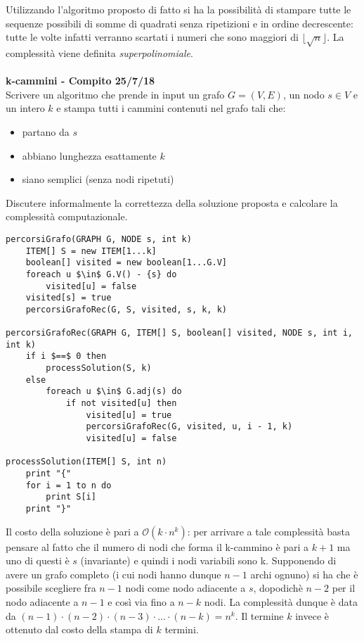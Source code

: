 \documentclass[../cheatSheetAlgoritmi.tex]{subfiles}
\begin{document}
Utilizzando l'algoritmo proposto di fatto si ha la possibilità di stampare tutte le sequenze possibili di somme di quadrati senza ripetizioni e in ordine decrescente: tutte le volte infatti verranno scartati i numeri che sono maggiori di $\lfloor \sqrt n \rfloor$. La complessità viene definita \emph{superpolinomiale}.\\\\
\textbf{k-cammini - Compito 25/7/18}\\
Scrivere un algoritmo che prende in input un grafo $G= (V, E)$, un nodo $s \in V$ e un intero $k$ e stampa tutti i cammini contenuti nel grafo tali che:
\begin{itemize}
	\item partano da $s$
	\item abbiano lunghezza esattamente $k$
	\item siano semplici (senza nodi ripetuti)
\end{itemize}
Discutere informalmente la correttezza della soluzione proposta e calcolare la complessità computazionale.
\begin{lstlisting}[caption=Percorsi grafo]
percorsiGrafo(GRAPH G, NODE s, int k)
    ITEM[] S = new ITEM[1...k]
    boolean[] visited = new boolean[1...G.V]
    foreach u $\in$ G.V() - {s} do
        visited[u] = false
    visited[s] = true
    percorsiGrafoRec(G, S, visited, s, k, k)

percorsiGrafoRec(GRAPH G, ITEM[] S, boolean[] visited, NODE s, int i, int k)
    if i $==$ 0 then
        processSolution(S, k)
    else
        foreach u $\in$ G.adj(s) do
            if not visited[u] then
	            visited[u] = true
	            percorsiGrafoRec(G, visited, u, i - 1, k)
	            visited[u] = false
            
processSolution(ITEM[] S, int n)
    print "{"
    for i = 1 to n do
        print S[i]
    print "}"
\end{lstlisting}
Il costo della soluzione è pari a $\mathcal{O}(k \cdot n^{k})$: per arrivare a tale complessità basta pensare al fatto che il numero di nodi che forma il k-cammino è pari a $k+1$ ma uno di questi è $s$ (invariante) e quindi i nodi variabili sono k. Supponendo di avere un grafo completo (i cui nodi hanno dunque $n-1$ archi ognuno) si ha che è possibile scegliere fra $n-1$ nodi come nodo adiacente a $s$, dopodichè $n-2$ per il nodo adiacente a $n-1$ e così via fino a $n-k$ nodi. La complessità dunque è data da $(n-1) \cdot (n-2) \cdot (n-3) \cdot ... \cdot (n-k) = n^{k}$. Il termine $k$ invece è ottenuto dal costo della stampa di $k$ termini.
\newpage
\end{document}
